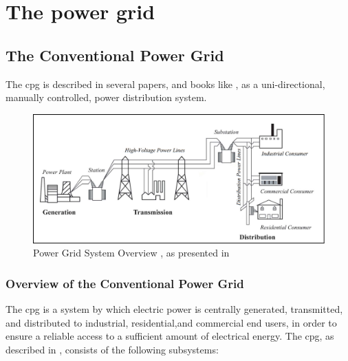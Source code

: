  



\chapter{The power grid}






\section{The Conventional Power Grid}
The \acrfull{cpg} is described in several papers, and books like \cite{BlumeStevenW2007Epsb}, as  a uni-directional, manually controlled, power distribution system.  

\begin{figure}[ht]
\includegraphics[width=\linewidth]{figures/Blume-PowerGrid-SystemOverView.png}
\caption[Power Grid System Overview]{Power Grid System Overview , as presented in \cite{BlumeStevenW2007Epsb}}
\label{fig:Blume-PowerGrid-SystemOverView}
\end{figure}



\subsection{Overview of the Conventional Power Grid}
The \acrlong{cpg} is a system by which electric power is centrally generated, transmitted, and distributed to industrial, residential,and commercial end users, in order to ensure a reliable access to a sufficient amount of electrical energy. 
\newpage
The \acrlong{cpg}, as described in \cite{BlumeStevenW2007Epsb}, consists of the following subsystems:

